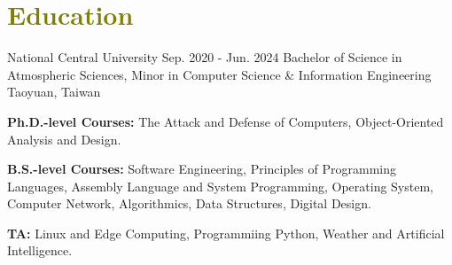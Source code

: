 

\section{\textcolor{olive}{\textbf{Education}}}
	\resumeSubHeadingListStart
		
    \resumeSubheading
        { National Central University}
        {Sep. 2020 - Jun. 2024}
        {Bachelor of Science in Atmospheric Sciences, Minor in Computer Science \& Information Engineering \myScore}
        {\textcolor{gray}{\footnotesize{\faMapMarker}} Taoyuan, Taiwan}
		
    \vspace{-1.0mm}
		
    \resumeItemListStart
        \item {
            \textbf{Ph.D.-level Courses:}
            The Attack and Defense of Computers,
            Object-Oriented Analysis and Design.
        }
        \item {
            \textbf{B.S.-level Courses:}
            Software Engineering,
            Principles of Programming Languages,
            Assembly Language and System Programming,
            Operating System,
            Computer Network,
            Algorithmics, 
            Data Structures, 
            Digital Design.
        }
        \item {
            \textbf{TA:} 
            Linux and Edge Computing,
            Programmiing Python, 
            Weather and Artificial Intelligence.
        }
    \resumeItemListEnd
		  
	\resumeSubHeadingListEnd
